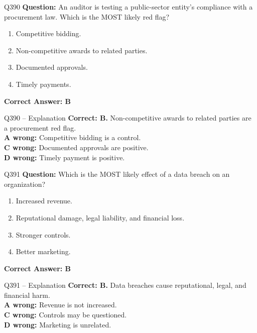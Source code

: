 \documentclass[aspectratio=169,10pt]{beamer}
\begin{document}
	\begin{frame}[t]{Q390}
		\small
		\textbf{Question:} An auditor is testing a public-sector entity's compliance with a procurement law. Which is the MOST likely red flag?
		\begin{enumerate}[label=\Alph*.,itemsep=1pt,topsep=2pt]
			\item Competitive bidding.
			\item Non-competitive awards to related parties.
			\item Documented approvals.
			\item Timely payments.
		\end{enumerate}
		\vspace{4pt}
		\textbf{Correct Answer: B}
	\end{frame}
	
	\begin{frame}[t]{Q390 -- Explanation}
		\small
		\textbf{Correct: B.} Non-competitive awards to related parties are a procurement red flag. \\[4pt]
		\textbf{A wrong:} Competitive bidding is a control. \\[2pt]
		\textbf{C wrong:} Documented approvals are positive. \\[2pt]
		\textbf{D wrong:} Timely payment is positive.
	\end{frame}
	
	\begin{frame}[t]{Q391}
		\small
		\textbf{Question:} Which is the MOST likely effect of a data breach on an organization?
		\begin{enumerate}[label=\Alph*.,itemsep=1pt,topsep=2pt]
			\item Increased revenue.
			\item Reputational damage, legal liability, and financial loss.
			\item Stronger controls.
			\item Better marketing.
		\end{enumerate}
		\vspace{4pt}
		\textbf{Correct Answer: B}
	\end{frame}
	
	\begin{frame}[t]{Q391 -- Explanation}
		\small
		\textbf{Correct: B.} Data breaches cause reputational, legal, and financial harm. \\[4pt]
		\textbf{A wrong:} Revenue is not increased. \\[2pt]
		\textbf{C wrong:} Controls may be questioned. \\[2pt]
		\textbf{D wrong:} Marketing is unrelated.
	\end{frame}
	
\end{document}
